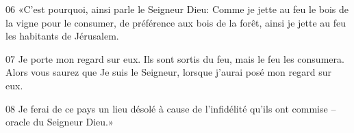 
06 «C’est pourquoi, ainsi parle le Seigneur Dieu: Comme je jette au feu le bois de la vigne pour le consumer, de préférence aux bois de la forêt, ainsi je jette au feu les habitants de Jérusalem.

07 Je porte mon regard sur eux. Ils sont sortis du feu, mais le feu les consumera. Alors vous saurez que Je suis le Seigneur, lorsque j’aurai posé mon regard sur eux.

08 Je ferai de ce pays un lieu désolé à cause de l’infidélité qu’ils ont commise – oracle du Seigneur Dieu.»